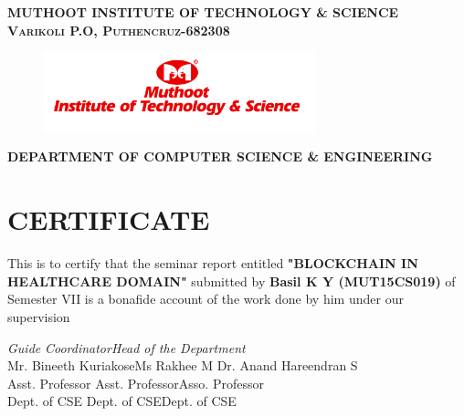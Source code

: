 \documentclass[12pt]{report}
\begin{document}
\newpage\begin{titlepage}
\center


\textsc{ \textbf{MUTHOOT INSTITUTE OF TECHNOLOGY \& SCIENCE}}\\
\textsc{\textbf{Varikoli P.O, Puthencruz-682308}}
\vspace{0.7cm}
\begin{figure}[H]
\centering
\includegraphics[width=0.7\textwidth]{logo.png}\\
\end{figure}
\vspace{0.2cm}
\textsc{ \small \textbf{ DEPARTMENT OF COMPUTER SCIENCE \& ENGINEERING}}\\
\section*{\centering CERTIFICATE}
\begin{center}
 This is to certify that the seminar report entitled \textbf{"BLOCKCHAIN IN HEALTHCARE DOMAIN"} submitted by \textbf{Basil K Y (MUT15CS019)} of Semester VII is  a bonafide account of the work done by him under our supervision\\
\end{center}
\vspace{5cm}




\noindent  \emph{Guide} \hspace{3.6cm} \emph{Coordinator}\hfill \emph{Head of the Department}
\\
\noindent Mr. Bineeth Kuriakose\hspace{0.82cm}Ms Rakhee M \hfill Dr. Anand Hareendran S\\
\noindent Asst. Professor\hspace{2.10cm} Asst. Professor\hfill Asso. Professor\\
\noindent Dept. of CSE\hspace{2.39cm} Dept. of CSE\hfill Dept. of CSE




\end{titlepage}
\newpage
{}
\end{document}
